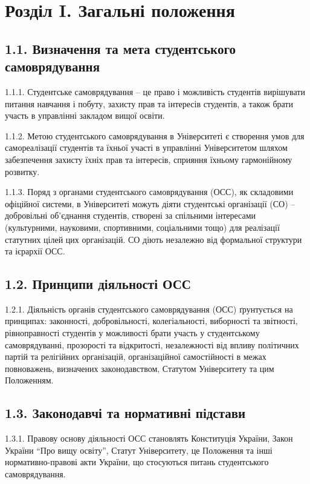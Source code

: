 \section*{Розділ I. Загальні положення}

\subsection*{1.1. Визначення та мета студентського самоврядування}
    1.1.1. Студентське самоврядування -- це право і можливість студентів вирішувати питання навчання і побуту, захисту прав та інтересів студентів, а також брати участь в управлінні закладом вищої освіти.

    1.1.2. Метою студентського самоврядування в Університеті є створення умов для самореалізації студентів та їхньої участі в управлінні Університетом шляхом забезпечення захисту їхніх прав та інтересів, сприяння їхньому гармонійному розвитку.

    1.1.3. Поряд з органами студентського самоврядування (ОСС), як складовими офіційної системи, в Університеті можуть діяти студентські організації (СО) – добровільні об'єднання студентів, створені за спільними інтересами (культурними, науковими, спортивними, соціальними тощо) для реалізації статутних цілей цих організацій. СО діють незалежно від формальної структури та ієрархії ОСС.

\subsection*{1.2. Принципи діяльності ОСС}
    1.2.1. Діяльність органів студентського самоврядування (ОСС) ґрунтується на принципах: законності, добровільності, колегіальності, виборності та звітності, рівноправності студентів у можливості брати участь у студентському самоврядуванні, прозорості та відкритості, незалежності від впливу політичних партій та релігійних організацій, організаційної самостійності в межах повноважень, визначених законодавством, Статутом Університету та цим Положенням.

\subsection*{1.3. Законодавчі та нормативні підстави}
    1.3.1. Правову основу діяльності ОСС становлять Конституція України, Закон України ``Про вищу освіту'', Статут Університету, це Положення та інші нормативно-правові акти України, що стосуються питань студентського самоврядування.

